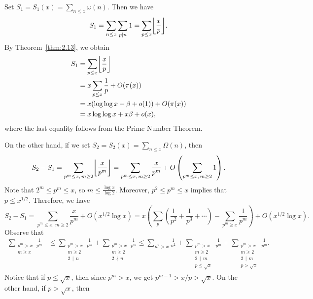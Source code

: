 \begin{pf}
    Set $S_1 = S_1(x) = \sum_{n\leq x} \omega(n)$. Then we have 
    \[ S_1 = \sum_{n\leq x} \sum_{p\mid n} 1 = \sum_{p\leq x} \floor*{\frac{x}{p}}. \] 
    By Theorem~\ref{thm:2.13}, we obtain 
    \begin{align*} 
        S_1 &= \sum_{p\leq x} \floor*{\frac{x}{p}} \\
        &= x \sum_{p\leq x} \frac{1}{p} + O(\pi(x)) \\
        &= x(\log\log x + \beta + o(1)) + O(\pi(x)) \\
        &= x\log\log x + x\beta + o(x), 
    \end{align*}
    where the last equality follows from the Prime Number Theorem. 

    On the other hand, if we set $S_2 = S_2(x) = \sum_{n\leq x} \Omega(n)$, then 
    \[ S_2 - S_1 = \sum_{p^m \leq x,\, m \geq 2} \floor*{\frac{x}{p^m}} 
    = \sum_{p^m \leq x,\, m\geq 2} \frac{x}{p^m} + 
    O \left( \sum_{p^m \leq x,\, m \geq 2} 1 \right). \] 
    Note that $2^m \leq p^m \leq x$, so $m \leq \frac{\log x}{\log 2}$. 
    Moreover, $p^2 \leq p^m \leq x$ implies that $p \leq x^{1/2}$. Therefore, 
    we have 
    \[ S_2 - S_1 = \sum_{p^m \leq x,\, m\geq 2} \frac{x}{p^m} + 
    O(x^{1/2} \log x) = x \left( \sum_p \left( \frac{1}{p^2} + 
    \frac{1}{p^3} + \cdots \right) - \sum_{p^m \geq x} \frac{1}{p^m} \right) 
    + O(x^{1/2} \log x). \] 
    Observe that 
    \begin{align*}
        \sum_{\substack{p^m > x \\ m \geq x}} \frac{1}{p^m} 
        &\leq \sum_{\substack{p^m > x \\ m \geq 2 \\ 2\,\mid\,n}} \frac{1}{p^m} 
        + \sum_{\substack{p^m > x \\ m \geq 2 \\ 2\,\nmid\,n}} \frac{1}{p^m} 
        \leq \sum_{n^2 > x} \frac{1}{n^2} + \sum_{\substack{p^m > x \\
        m \geq 2 \\ 2\,\mid\,m \\ p \leq \sqrt{x}}} \frac{1}{p^m} 
        + \sum_{\substack{p^m > x \\ 
        m \geq 2 \\ 2\,\mid\,m \\ p > \sqrt{x}}} \frac{1}{p^m}. 
    \end{align*}
    Notice that if $p \leq \sqrt{x}$, then since $p^m > x$, we get 
    $p^{m-1} > x/p > \sqrt{x}$. On the other hand, if $p > \sqrt{x}$, then 

\end{pf}
